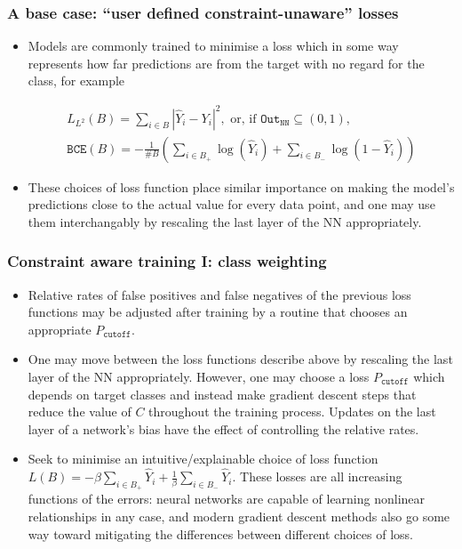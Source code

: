 \documentclass{beamer}
\newcommand{\OUT}{{\texttt{Out}}}
\newcommand{\CO}{{P_{\texttt{cutoff}}}}
\newcommand{\YP}{{\hat Y}}
\begin{document}
\begin{frame}
\frametitle{A base case: ``user defined constraint-unaware'' losses}
\begin{itemize}
\item
Models are commonly trained to minimise a loss which in some way represents how far predictions are from the target with no regard for the class, for example

\begin{gather*}
  L_{L^2}(B)=\sum_{i\in B} |\YP_i-Y_i|^2,\text{ or, if }\OUT_{\texttt{NN}}\subseteq(0,1),\\
  \texttt{BCE}(B)=-\tfrac1{\#B}\left(\sum_{i\in B_+}\log(\hat Y_i)+\sum_{i\in B_-}\log(1-\hat Y_i)\right)
\end{gather*}
\item
These choices of loss function place similar importance on making the model's predictions close to the actual value for every data point, and one may use them interchangably by rescaling the last layer of the NN appropriately.
\end{itemize}
\end{frame}
\begin{frame}
\frametitle{Constraint aware training I: class weighting}
\begin{itemize}
\item
  Relative rates of false positives and false negatives of the previous loss functions may be adjusted after training by a routine that chooses an appropriate $\CO$.
\item One may move between the loss functions describe above by rescaling the last layer of the NN appropriately.
  However, one may choose a loss $\CO$ which depends on target classes and instead make gradient descent steps that reduce the value of $C$ throughout the training process.
  Updates on the last layer of a network's bias have the effect of controlling the relative rates.
\item
  Seek to minimise an intuitive/explainable choice of loss function $L(B)=-\beta\sum_{i\in B_+}\hat Y_i+\tfrac1\beta\sum_{i\in B_-}\hat Y_i$.
  These losses are all increasing functions of the errors: neural networks are capable of learning nonlinear relationships in any case, and modern gradient descent methods also go some way toward mitigating the differences between different choices of loss.
\end{itemize}
\end{frame}
\end{document}
